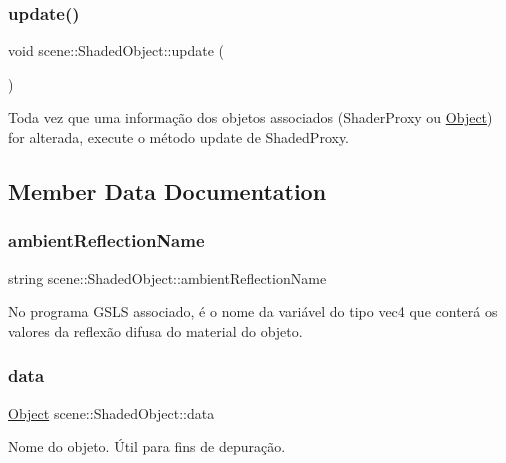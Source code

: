 \subsubsection{\texorpdfstring{update()}{update()}}
{\footnotesize\ttfamily void scene\+::\+Shaded\+Object\+::update (\begin{DoxyParamCaption}{ }\end{DoxyParamCaption})\hspace{0.3cm}{\ttfamily [inline]}}

Toda vez que uma informação dos objetos associados (Shader\+Proxy ou \mbox{\hyperlink{classscene_1_1_object}{Object}}) for alterada, execute o método update de Shaded\+Proxy. 

\subsection{Member Data Documentation}
\mbox{\label{classscene_1_1_shaded_object_a7c49116b11a05b9a7eed925e83e27ee4}} 
\subsubsection{\texorpdfstring{ambient\+Reflection\+Name}{ambientReflectionName}}
{\footnotesize\ttfamily string scene\+::\+Shaded\+Object\+::ambient\+Reflection\+Name}

No programa G\+S\+LS associado, é o nome da variável do tipo vec4 que conterá os valores da reflexão difusa do material do objeto. \mbox{\label{classscene_1_1_shaded_object_ad5127e62295e11f3ae4af42e2e517bff}} 
\subsubsection{\texorpdfstring{data}{data}}
{\footnotesize\ttfamily \mbox{\hyperlink{classscene_1_1_object}{Object}} scene\+::\+Shaded\+Object\+::data}

Nome do objeto. Útil para fins de depuração. \mbox{\label{classscene_1_1_shaded_object_a71a51a5d138c364b956684a7e0394eac}} 
